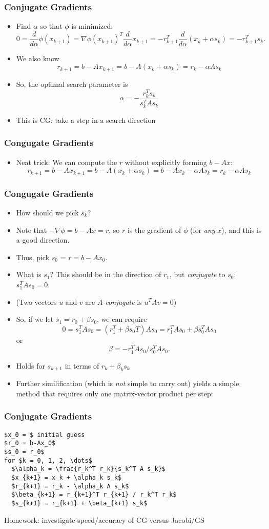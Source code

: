 \documentclass[10pt]{beamer}
\begin{document}
\begin{frame}
\frametitle{Conjugate Gradients}
\begin{itemize}
\item Find $\alpha$ so that $\phi$ is minimized:
\[
0 = \frac{d}{d\alpha}\phi(x_{k+1}) 
  = \nabla \phi(x_{k+1})^T \frac{d}{d\alpha}x_{k+1} 
 = -r_{k+1}^T \frac{d}{d\alpha}(x_k + \alpha s_k) 
 = -r_{k+1}^T s_k.
\]
\item We also know
\[
r_{k+1} = b-Ax_{k+1} = b-A(x_k + \alpha s_k) = r_k - \alpha A s_k
\]
\item So, the optimal search parameter is
\[
\alpha = -\frac{r_k^T s_k}{s_k^T A s_k}
\]

\item This is CG: take a step in a search direction
\end{itemize}
\end{frame}
\begin{frame}
\frametitle{Congugate Gradients}
\begin{itemize}
\item Neat trick:  We can compute the $r$ without explicitly forming $b-Ax$:
\[
   r_{k+1} = b - Ax_{k+1} = b - A(x_k +\alpha s_k) = b - Ax_k - \alpha As_k =
r_k - \alpha A s_k
\]
\end{itemize}
\end{frame}
\begin{frame}
\frametitle{Congugate Gradients}
\begin{itemize}
\item How should we pick $s_k$?
\item Note that $- \nabla \phi = b-Ax = r$, so $r$ is the gradient of $\phi$ 
(for \emph{any} $x$), and this is a good direction.  
\item Thus, pick $s_0$ = $r=b-Ax_0$.
\item What is $s_1$?  This should be in the direction of $r_1$, but 
\emph{conjugate} to $s_0$: $s_1^T A s_0 = 0$.  
\item (Two vectors $u$ and $v$ are \emph{$A$-conjugate} is $u^TAv = 0$)
\item So, if we let $s_1 = r_0 + \beta s_0$, we can require 
\[
    0 = s_1^TAs_0 = (r_1^T + \beta s_0T)As_0 = r_1^TAs_0 + \beta s_0^T A s_0
\]
or 
\[
    \beta = - r_1^TAs_0 / s_0^TAs_0.
\]
\item Holds for $s_{k+1}$ in terms of $r_k + \beta_k s_k$
\item Further similification (which is \emph{not} simple to carry out) 
yields a simple method that requires only one matrix-vector product per step:
\end{itemize}
\end{frame}
\begin{frame}[fragile]
\frametitle{Conjugate Gradients}
\begin{lstlisting}[mathescape]
$x_0 = $ initial guess
$r_0 = b-Ax_0$
$s_0 = r_0$
for $k = 0, 1, 2, \dots$
  $\alpha_k = \frac{r_k^T r_k}{s_k^T A s_k}$
  $x_{k+1} = x_k + \alpha_k s_k$
  $r_{k+1} = r_k - \alpha_k A s_k$
  $\beta_{k+1} = r_{k+1}^T r_{k+1} / r_k^T r_k$
  $s_{k+1} = r_{k+1} + \beta_{k+1} s_k$
\end{lstlisting}
\end{frame}
\bigskip

Homework:  investigate speed/accuracy of CG versus Jacobi/GS
\end{document}
